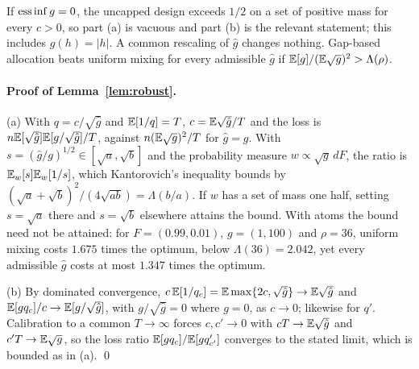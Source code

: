 If $\operatorname*{ess\,inf} g=0$, the uncapped design exceeds $1/2$ on a set of positive mass for
every $c>0$, so part (a) is vacuous and part (b) is the relevant statement; this
includes $g(h)=|h|$. A common rescaling of $\hat g$ changes nothing. Gap-based
allocation beats uniform mixing for every admissible $\hat g$ if
$\mathbb{E}[g]/(\mathbb{E}\sqrt g)^2>\Lambda(\rho)$.

\paragraph{Proof of Lemma~\ref{lem:robust}.} (a) With $q=c/\sqrt{\hat g}$ and
$\mathbb{E}[1/q]=T$, $c=\mathbb{E}\sqrt{\hat g}/T$ and the loss is
$n\mathbb{E}[\sqrt{\hat g}]\mathbb{E}[g/\sqrt{\hat g}]/T$, against $n(\mathbb{E}\sqrt g)^2/T$ for $\hat g=g$.
With $s=(\hat g/g)^{1/2}\in[\sqrt a,\sqrt b]$ and the probability measure
$w\propto\sqrt g\,dF$, the ratio is $\mathbb{E}_w[s]\mathbb{E}_w[1/s]$, which Kantorovich's
inequality bounds by $(\sqrt a+\sqrt b)^2/(4\sqrt{ab})=\Lambda(b/a)$. If $w$ has a set
of mass one half, setting $s=\sqrt a$ there and $s=\sqrt b$ elsewhere attains the
bound. With atoms the bound need not be attained: for $F=(0.99,0.01)$, $g=(1,100)$
and $\rho=36$, uniform mixing costs $1.675$ times the optimum, below
$\Lambda(36)=2.042$, yet every admissible $\hat g$ costs at most $1.347$ times the
optimum.

(b) By dominated convergence, $c\,\mathbb{E}[1/q_c]=\mathbb{E}\max\{2c,\sqrt{\hat g}\}\to\mathbb{E}\sqrt{\hat g}$
and $\mathbb{E}[gq_c]/c\to\mathbb{E}[g/\sqrt{\hat g}]$, with $g/\sqrt{\hat g}=0$ where $g=0$, as
$c\to0$; likewise for $q'$. Calibration to a common $T\to\infty$ forces $c,c'\to0$
with $cT\to\mathbb{E}\sqrt{\hat g}$ and $c'T\to\mathbb{E}\sqrt g$, so the loss ratio
$\mathbb{E}[gq_c]/\mathbb{E}[gq'_{c'}]$ converges to the stated limit, which is bounded as in (a). \qed

